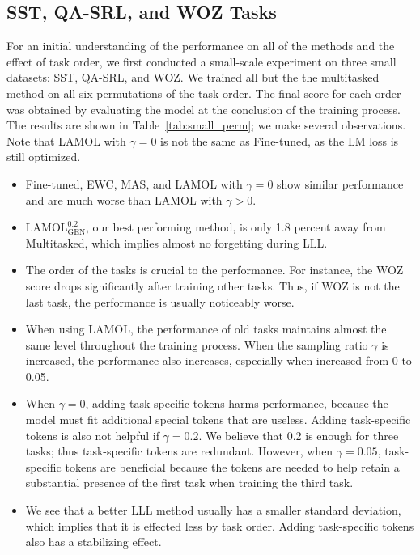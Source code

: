 \documentclass{article} %
\begin{document}
\subsection{SST, QA-SRL, and WOZ Tasks}
For an initial understanding of the performance on all of the methods and the effect of task order, we first conducted a small-scale experiment on three small datasets: SST, QA-SRL, and WOZ.
We trained all but the the multitasked method on all six permutations of the task order.
The final score for each order was obtained by evaluating the model at the conclusion of the training process.
The results are shown in Table~\ref{tab:small_perm}; we make several observations.
Note that LAMOL with $\gamma = 0$ is not the same as Fine-tuned, as the LM loss is still optimized.
\begin{itemize}[leftmargin=*]
    \item Fine-tuned, EWC, MAS, and LAMOL with $\gamma = 0$ show similar performance and are much worse than LAMOL with $\gamma > 0$.
    \item $\text{LAMOL}^{0.2}_{\text{GEN}}$, our best performing method, is only 1.8 percent away from Multitasked, which implies almost no forgetting during LLL.
    \item The order of the tasks is crucial to the performance.
    For instance, the WOZ score drops significantly after training other tasks.
    Thus, if WOZ is not the last task, the performance is usually noticeably worse.
    \item When using LAMOL, the performance of old tasks maintains almost the same level throughout the training process.
    When the sampling ratio $\gamma$ is increased, the performance also increases, especially when increased from 0 to 0.05.
    \item When $\gamma = 0$, adding task-specific tokens harms performance, because the model must fit additional special tokens that are useless.
    Adding task-specific tokens is also not helpful if $\gamma = 0.2$. We believe that 0.2 is enough for three tasks; thus task-specific tokens are redundant.
    However, when $\gamma = 0.05$, task-specific tokens are beneficial because the tokens are needed to help retain a substantial presence of the first task when training the third task.
    \item  We see that a better LLL method usually has a smaller standard deviation, which implies that it is effected less by task order. Adding task-specific tokens also has a stabilizing effect.
\end{itemize}
\end{document}
